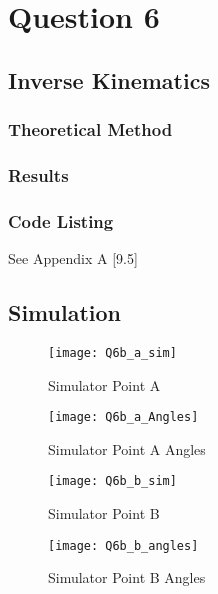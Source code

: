 \newpage
\section{Question 6}
	\subsection{Inverse Kinematics}
	\subsubsection{Theoretical Method}

	
		\subsubsection{Results}

	\subsubsection{Code Listing}
		See Appendix A [9.5]
		
	\subsection{Simulation}

	\begin{figure}[position = here]
		\begin{centering}
			\texttt{[image: Q6b\_a\_sim]}\\
			\caption [SIMA1]{Simulator Point A}
		\end{centering}
	\end{figure}

	\begin{figure}[position = here]
		\begin{centering}
			\texttt{[image: Q6b\_a\_Angles]}\\
			\caption [SIMA1]{Simulator Point A Angles}
		\end{centering}
	\end{figure}

	\begin{figure}[position = here]
		\begin{centering}
			\texttt{[image: Q6b\_b\_sim]}\\
			\caption [SIMB1]{Simulator Point B}
		\end{centering}
	\end{figure}

	\begin{figure}[position = here]
		\begin{centering}
			\texttt{[image: Q6b\_b\_angles]}\\
			\caption [SIMB2]{Simulator Point B Angles}
		\end{centering}
	\end{figure}
\pagebreak